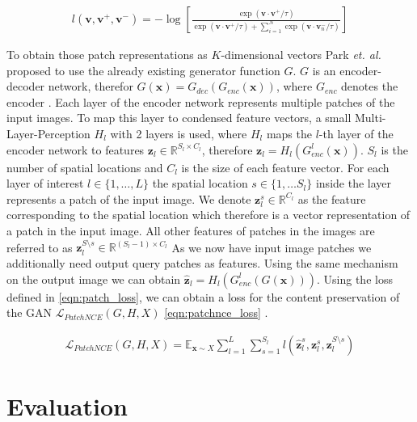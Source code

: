 \documentclass[a4paper,11pt, DIV=12]{scrartcl}
\newcommand{\x}{\boldsymbol{x}}
\newcommand{\vp}{\boldsymbol{v}^+}
\newcommand{\vm}{\boldsymbol{v}^-}
\newcommand{\ve}{\boldsymbol{v}}
\begin{document}
\begin{equation}
   \label{eqn:patch_loss}
   \begin{aligned}
      l(\ve, \vp, \vm) = - \log \left[ \frac{\exp(\ve \cdot \vp / \tau)}{\exp(\ve \cdot \vp / \tau) + \sum_{i=1}^N\exp(\ve \cdot \ve_n^- / \tau)}\right]
   \end{aligned}
\end{equation}

To obtain those patch representations as $K$-dimensional vectors Park \textit{et. al.} proposed to use the already existing 
generator function $G$. $G$ is an encoder-decoder network, therefor $G(\x) = G_{dec}(G_{enc}(\x))$, where $G_{enc}$ denotes the encoder \cite{cut}. 
Each layer of the encoder network represents multiple patches of the input images. To map this layer to condensed feature vectors, 
a small Multi-Layer-Perception $H_l$ with 2 layers is used, where $H_l$ maps the $l$-th layer of the encoder network to features 
$\boldsymbol{z}_l \in \mathbb{R}^{S_l \times C_l}$, therefore $\boldsymbol{z}_l = H_l(G_{enc}^l(\x))$.
$S_l$ is the number of spatial locations and $C_l$ is the size of each feature vector. 
For each layer of interest $l \in \{1, \dots, L\}$ the spatial location $s \in \{1, \dots S_l\}$ inside the layer represents a patch of the input image.
We denote $\boldsymbol{z}_l^s \in \mathbb{R}^{C_l}$ as the feature corresponding to the spatial location which therefore is a vector representation of a patch 
in the input image. All other features of patches in the images are referred to as $\boldsymbol{z}_l^{S \setminus s} \in \mathbb{R}^{(S_l - 1) \times C_l}$  
As we now have input image patches we additionally need output query patches as features. Using the same mechanism on the output image we can obtain 
$\boldsymbol{\hat{z}}_l = H_l(G_{enc}^l(G(\x)))$. Using the loss defined in \autoref{eqn:patch_loss}, we can obtain a loss for the content preservation of the
GAN $\mathcal{L}_{PatchNCE}(G,H,X)$ \autoref{eqn:patchnce_loss} \cite{cut}.

\begin{equation}
   \label{eqn:patchnce_loss}
   \begin{aligned}
      \mathcal{L}_{PatchNCE}(G,H,X) = \mathbb{E}_{\x \sim X} \sum_{l = 1}^L \sum_{s=1}^{S_l} l(\boldsymbol{\hat{z}}_l^s, \boldsymbol{z}_l^s, \boldsymbol{z}_l^{S \setminus s})
   \end{aligned}
\end{equation}


\section{Evaluation}
\end{document}
